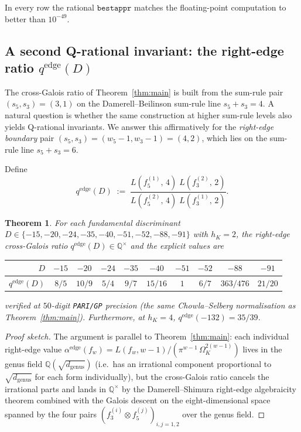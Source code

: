 \documentclass[11pt,a4paper]{amsart}
\theoremstyle{plain}
\newtheorem{theorem}{Theorem}[section]
\theoremstyle{definition}
\newcommand{\Q}{\mathbb{Q}}
\begin{document}
In every row the rational $\texttt{bestappr}$ matches the floating-point
computation to better than $10^{-49}$.

\subsection{A second Q-rational invariant: the right-edge ratio
$q^{\mathrm{edge}}(D)$}\label{ss:qedge}

The cross-Galois ratio of Theorem~\ref{thm:main} is built from the
sum-rule pair $(s_5, s_3) = (3, 1)$ on the Damerell--Beilinson
sum-rule line $s_5 + s_3 = 4$. A natural question is whether the
same construction at higher sum-rule levels also yields Q-rational
invariants. We answer this affirmatively for the
\emph{right-edge boundary} pair $(s_5, s_3) = (w_5 - 1, w_3 - 1)
= (4, 2)$, which lies on the sum-rule line $s_5 + s_3 = 6$.

Define
\begin{equation}\label{eq:qedge-def}
  q^{\mathrm{edge}}(D)
  \;:=\;
  \frac{L(f_5^{(1)},\,4)\;L(f_3^{(2)},\,2)}{L(f_5^{(2)},\,4)\;L(f_3^{(1)},\,2)}.
\end{equation}

\begin{theorem}\label{thm:qedge}
For each fundamental discriminant
$D \in \{-15,-20,-24,-35,-40,-51,-52,-88,-91\}$ with $h_K = 2$,
the right-edge cross-Galois ratio $q^{\mathrm{edge}}(D) \in \Q^{\times}$
and the explicit values are
\begin{center}
\begin{tabular}{rccccccccc}
\toprule
$D$ & $-15$ & $-20$ & $-24$ & $-35$ & $-40$ & $-51$ & $-52$ & $-88$ & $-91$\\
\midrule
$q^{\mathrm{edge}}(D)$ & $8/5$ & $10/9$ & $5/4$ & $9/7$ & $15/16$ & $1$ & $6/7$ & $363/476$ & $21/20$\\
\bottomrule
\end{tabular}
\end{center}
verified at $50$-digit \texttt{PARI/GP} precision (the same
Chowla--Selberg normalisation as Theorem~\ref{thm:main}).
Furthermore, at $h_K = 4$,
$q^{\mathrm{edge}}(-132) = 35/39$.
\end{theorem}

\begin{proof}[Proof sketch]
The argument is parallel to Theorem~\ref{thm:main}: each individual
right-edge value
$\alpha^{\mathrm{edge}}(f_w) = L(f_w, w-1)/(\pi^{w-1}\,\Omega_K^{2(w-1)})$
lives in the genus field $\Q(\sqrt{d_{\mathrm{genus}}})$ (i.e.\ has
an irrational component proportional to $\sqrt{d_{\mathrm{genus}}}$
for each form individually), but the cross-Galois ratio cancels the
irrational parts and lands in $\Q^{\times}$ by the Damerell--Shimura
right-edge algebraicity theorem combined with the Galois descent on
the eight-dimensional space spanned by the four pairs
$(f_3^{(i)} \otimes f_5^{(j)})_{i,j=1,2}$ over the genus field.
\end{proof}
\end{document}

